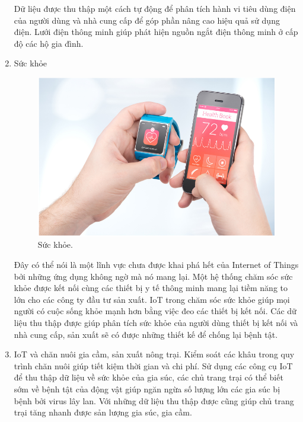 \begin{enumerate}
    Dữ liệu được thu thập một cách tự động để phân tích hành vi tiêu dùng điện của người dùng và nhà cung cấp để góp phần nâng cao hiệu quả sử dụng điện. Lưới điện thông minh giúp phát hiện nguồn ngắt điện thông minh ở cấp độ các hộ gia đình.
    
    \item Sức khỏe
\begin{center}
    \begin{figure}[htp]
    \begin{center}
     \includegraphics[scale=0.6]{image1/suckhoe.png}
    \end{center}
    \caption{Sức khỏe.}
    \label{refhinh1}
    \end{figure}
\end{center} 
    Đây có thể nói là một lĩnh vực chưa được khai phá hết của Internet of Things bởi những ứng dụng không ngờ mà nó mang lại. Một hệ thống chăm sóc sức khỏe được kết nối cùng các thiết bị y tế thông minh mang lại tiềm năng to lớn cho các công ty đầu tư sản xuất. IoT trong chăm sóc sức khỏe giúp mọi người có cuộc sống khỏe mạnh hơn bằng việc đeo các thiết bị kết nối. Các dữ liệu thu thập được giúp phân tích sức khỏe của người dùng thiết bị kết nối và nhà cung cấp, sản xuất sẽ có được những thiết kế để chống lại bệnh tật.
    
    \item IoT và chăn nuôi gia cầm, sản xuất nông trại.
    Kiểm soát các khâu trong quy trình chăn nuôi giúp tiết kiệm thời gian và chi phí. Sử dụng các công cụ IoT để thu thập dữ liệu về sức khỏe của gia súc, các chủ trang trại có thể biết sớm về bệnh tật của động vật giúp ngăn ngừa số lượng lớn các gia súc bị bệnh bởi virus lây lan. Với những dữ liệu thu thập được cũng giúp chủ trang trại tăng nhanh được sản lượng gia súc, gia cầm.


\end{enumerate}
